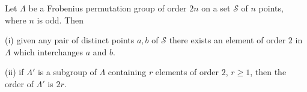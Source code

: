 Let $\Lambda$ be a Frobenius permutation group of order $2n$ on a set $\mathcal{S}$ of $n$ points, where $n$ is odd. Then

(i) given any pair of distinct points $a, b$ of $\mathcal{S}$ there exists an element of order $2$ in $\Lambda$ which interchanges $a$ and $b$.

(ii) if $\Lambda'$ is a subgroup of $\Lambda$ containing $r$ elements of order $2$, $r \geq 1$, then the order of $\Lambda'$ is $2r$.
